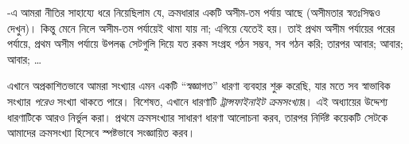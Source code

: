 \documentclass[../../../include/open-logic-section]{subfiles}
\begin{document}


-এ আমরা \stagesinf{} নীতির সাহায্যে
ধরে নিয়েছিলাম যে, ক্রমধারার একটি অসীম-তম পর্যায় আছে
(অসীমতার স্বতঃসিদ্ধও দেখুন)। কিন্তু \stagessucc{} মেনে
নিলে অসীম-তম পর্যায়েই থামা যায় না; এগিয়ে যেতেই হয়।
তাই প্রথম অসীম পর্যায়ের পরের পর্যায়ে, প্রথম অসীম
পর্যায়ে উপলব্ধ সেটগুলি দিয়ে যত রকম সংগ্রহ গঠন সম্ভব,
সব গঠন করি; তারপর আবার; আবার; আবার; \dots

এখানে অপ্রকাশিতভাবে আমরা সংখ্যার এমন একটি
``স্বজ্ঞাগত'' ধারণা ব্যবহার শুরু করেছি, যার মতে সব
স্বাভাবিক সংখ্যার \emph{পরেও} সংখ্যা থাকতে পারে।
বিশেষত, এখানে ধারণাটি \emph{ট্রান্সফাইনাইট ক্রমসংখ্যা}র।
এই অধ্যায়ের উদ্দেশ্য ধারণাটিকে আরও নির্ভুল করা।
প্রথমে ক্রমসংখ্যার সাধারণ ধারণা আলোচনা করব, তারপর
নির্দিষ্ট কয়েকটি সেটকে আমাদের ক্রমসংখ্যা হিসেবে
স্পষ্টভাবে সংজ্ঞায়িত করব।
\end{document}
